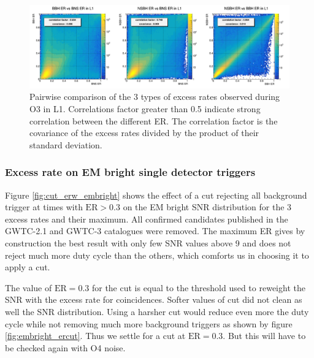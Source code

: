 \begin{figure}[hb]
  \centering
  \includegraphics[width=\textwidth]{sectionSelection/plotsOther/correlERL1.png}
  \caption{Pairwise comparison of the 3 types of excess rates observed during O3 in L1. Correlations factor greater than 0.5 indicate strong correlation between the different ER. The correlation factor is the covariance of the excess rates divided by the product of their standard deviation.}
  \label{fig:correl_erw}
\end{figure}



\subsubsection{Excess rate on EM bright single detector triggers}
\label{sec:embright_er}

Figure \ref{fig:cut_erw_embright} shows the effect of a cut rejecting all background trigger at times with $\text{ER}>0.3$ on the EM bright SNR distribution for the 3 excess rates and their maximum.
All confirmed candidates published in the GWTC-2.1 \cite{gwtc2.1} and GWTC-3 \cite{gwtc3} catalogues were removed.
The maximum ER gives by construction the best result with only few SNR values above 9 and does not reject much more duty cycle than the others, which comforts us in choosing it to apply a cut.

The value of $\text{ER}=0.3$ for the cut is equal to the threshold used to reweight the SNR with the excess rate for coincidences.
Softer values of cut did not clean as well the SNR distribution.
Using a harsher cut would reduce even more the duty cycle while not removing much more background triggers as shown by figure \ref{fig:embright_ercut}.
Thus we settle for a cut at $\textrm{ER}=0.3$.
But this will have to be checked again with O4 noise.

